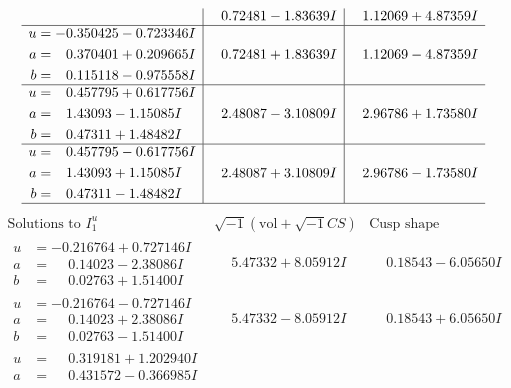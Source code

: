 \documentclass[1p]{elsarticle_modified}
\theoremstyle{definition}
\newcommand{\I}{\sqrt{-1}}
\begin{document}
$$\begin{array}{c|c|c}
 & \phantom{-}0.72481 - 1.83639 I & \phantom{-}1.12069 + 4.87359 I \\ \hline\begin{aligned}
u &= -0.350425 - 0.723346 I \\
a &= \phantom{-}0.370401 + 0.209665 I \\
b &= \phantom{-}0.115118 - 0.975558 I\end{aligned}
 & \phantom{-}0.72481 + 1.83639 I & \phantom{-}1.12069 - 4.87359 I \\ \hline\begin{aligned}
u &= \phantom{-}0.457795 + 0.617756 I \\
a &= \phantom{-}1.43093 - 1.15085 I \\
b &= \phantom{-}0.47311 + 1.48482 I\end{aligned}
 & \phantom{-}2.48087 - 3.10809 I & \phantom{-}2.96786 + 1.73580 I \\ \hline\begin{aligned}
u &= \phantom{-}0.457795 - 0.617756 I \\
a &= \phantom{-}1.43093 + 1.15085 I \\
b &= \phantom{-}0.47311 - 1.48482 I\end{aligned}
 & \phantom{-}2.48087 + 3.10809 I & \phantom{-}2.96786 - 1.73580 I\\
 \hline 
 \end{array}$$\newpage$$\begin{array}{c|c|c}  
\text{Solutions to }I^u_{1}& \I (\text{vol} + \sqrt{-1}CS) & \text{Cusp shape}\\
 \hline 
\begin{aligned}
u &= -0.216764 + 0.727146 I \\
a &= \phantom{-}0.14023 - 2.38086 I \\
b &= \phantom{-}0.02763 + 1.51400 I\end{aligned}
 & \phantom{-}5.47332 + 8.05912 I & \phantom{-}0.18543 - 6.05650 I \\ \hline\begin{aligned}
u &= -0.216764 - 0.727146 I \\
a &= \phantom{-}0.14023 + 2.38086 I \\
b &= \phantom{-}0.02763 - 1.51400 I\end{aligned}
 & \phantom{-}5.47332 - 8.05912 I & \phantom{-}0.18543 + 6.05650 I \\ \hline\begin{aligned}
u &= \phantom{-}0.319181 + 1.202940 I \\
a &= \phantom{-}0.431572 - 0.366985 I \\

\end{aligned}
\end{array}$$
\end{document}

